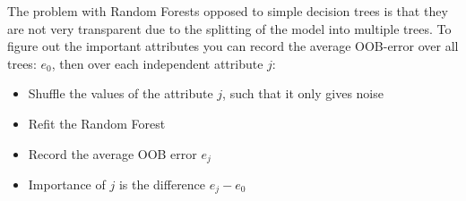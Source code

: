 The problem with Random Forests opposed to simple decision trees is
that they are not very transparent due to the splitting of the model
into multiple trees. To figure out the important attributes you can
record the average OOB-error over all trees: $e_0$, then over each
independent attribute $j$:

\begin{itemize}
  \item Shuffle the values of the attribute $j$, such that it only gives noise
  \item Refit the Random Forest
  \item Record the average OOB error $e_j$
  \item Importance of $j$ is the difference $e_j - e_0$
\end{itemize}



